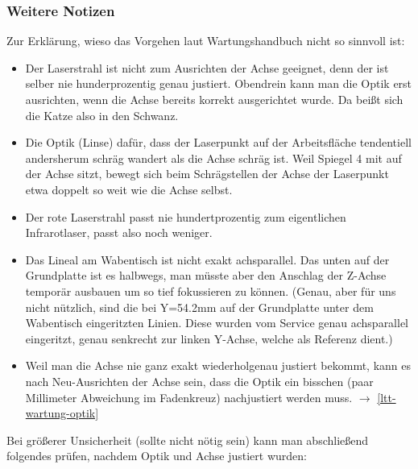 \documentclass{\basedir/fablab-document}
\begin{document}
	\subsubsection*{Weitere Notizen}
	Zur Erklärung, wieso das Vorgehen laut Wartungshandbuch nicht so sinnvoll ist:
	\begin{itemize}		
		\item Der Laserstrahl ist nicht zum Ausrichten der Achse geeignet, denn der ist selber nie hunderprozentig genau justiert. Obendrein kann man die Optik erst ausrichten, wenn die Achse bereits korrekt ausgerichtet wurde. Da beißt sich die Katze also in den Schwanz.
		
		\item Die Optik (Linse) dafür, dass der Laserpunkt auf der Arbeitsfläche tendentiell andersherum schräg wandert als die Achse schräg ist. Weil Spiegel 4 mit auf der Achse sitzt, bewegt sich beim Schrägstellen der Achse der Laserpunkt etwa doppelt so weit wie die Achse selbst.
		
		\item Der rote Laserstrahl passt nie hundertprozentig zum eigentlichen Infrarotlaser, passt also noch weniger.
		
		\item Das Lineal am Wabentisch ist nicht exakt achsparallel. Das unten auf der Grundplatte ist es halbwegs, man müsste aber den Anschlag der Z-Achse temporär ausbauen um so tief fokussieren zu können. (Genau, aber für uns nicht nützlich, sind die bei Y=54.2mm auf der Grundplatte unter dem Wabentisch eingeritzten Linien. Diese wurden vom Service genau achsparallel eingeritzt, genau senkrecht zur linken Y-Achse, welche als Referenz dient.)
		
		\item Weil man die Achse nie ganz exakt wiederholgenau justiert bekommt, kann es nach Neu-Ausrichten der Achse sein, dass die Optik ein bisschen (paar Millimeter Abweichung im Fadenkreuz) nachjustiert werden muss. $\rightarrow$ \cref{ltt-wartung-optik}
	\end{itemize}

	Bei größerer Unsicherheit (sollte nicht nötig sein) kann man abschließend folgendes prüfen, nachdem Optik und Achse justiert wurden:
\end{document}
